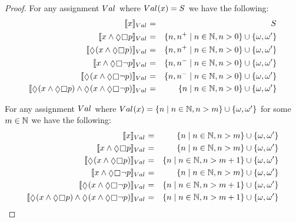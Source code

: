 \begin{proof}
For any assignment $\kAssignment$ where $\kAssignment(\varX) = \kStates$ we have the following:
\begin{eqnarray*}
    \interpretation[\kAssignment]{\varX} &=& \kStates\\
    \interpretation[\kAssignment]{\varX \land \possible \necessary \atomP} &=& \{n, n^+ \mid n \in \naturals, n > 0\} \cup \{\omega, \omega'\}\\
    \interpretation[\kAssignment]{\possible (\varX \land \possible \necessary \atomP)} &=& \{n, n^+ \mid n \in \naturals, n > 0\} \cup \{\omega, \omega'\}\\
    \interpretation[\kAssignment]{\varX \land \possible \necessary \neg \atomP} &=& \{n, n^- \mid n \in \naturals, n > 0\} \cup \{\omega, \omega'\}\\
    \interpretation[\kAssignment]{\possible (\varX \land \possible \necessary \neg \atomP)} &=& \{n, n^- \mid n \in \naturals, n > 0\} \cup \{\omega, \omega'\}\\
    \interpretation[\kAssignment]{\possible (\varX \land \possible \necessary \atomP) \land \possible (\varX \land \possible \necessary \neg \atomP)} &=& \{n \mid n \in \naturals, n > 0\} \cup \{\omega, \omega'\}
\end{eqnarray*}

For any assignment $\kAssignment$ where $\kAssignment(\varX) = \{n \mid n \in \naturals, n > m\} \cup \{\omega, \omega'\}$ for some $m \in \mathbb{N}$ we have the following:
\begin{eqnarray*}
    \interpretation[\kAssignment]{\varX} &=& \{n \mid n \in \naturals, n > m\} \cup \{\omega, \omega'\}\\
    \interpretation[\kAssignment]{\varX \land \possible \necessary \atomP} &=& \{n \mid n \in \naturals, n > m\} \cup \{\omega, \omega'\}\\
    \interpretation[\kAssignment]{\possible (\varX \land \possible \necessary \atomP)} &=& \{n \mid n \in \naturals, n > m + 1\} \cup \{\omega, \omega'\}\\
    \interpretation[\kAssignment]{\varX \land \possible \necessary \neg \atomP} &=& \{n \mid n \in \naturals, n > m\} \cup \{\omega, \omega'\}\\
    \interpretation[\kAssignment]{\possible (\varX \land \possible \necessary \neg \atomP)} &=& \{n \mid n \in \naturals, n > m + 1\} \cup \{\omega, \omega'\}\\
    \interpretation[\kAssignment]{\possible (\varX \land \possible \necessary \atomP) \land \possible (\varX \land \possible \necessary \neg \atomP)} &=& \{n \mid n \in \naturals, n > m + 1\} \cup \{\omega, \omega'\}
\end{eqnarray*}


\end{proof}
